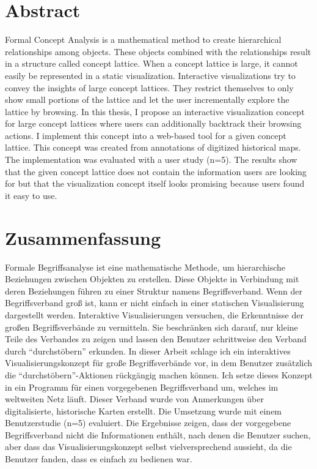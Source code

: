 \documentclass[11pt]{report}
\begin{document}


\renewcommand{\thepage}{\roman{page}}%

\newpage
\thispagestyle{empty}
\mbox{}

\chapter*{Abstract}
Formal Concept Analysis is a mathematical method to create hierarchical relationships among objects. These objects combined with the relationships result in a structure called concept lattice. When a concept lattice is large, it cannot easily be represented in a static visualization. Interactive visualizations try to convey the insights of large concept lattices. They restrict themselves to only show small portions of the lattice and let the user incrementally explore the lattice by browsing. In this thesis, I propose an interactive visualization concept for large concept lattices where users can additionally backtrack their browsing actions. I implement this concept into a web-based tool for a given concept lattice. This concept was created from annotations of digitized historical maps. The implementation was evaluated with a user study (n=5). The results show that the given concept lattice does not contain the information users are looking for but that the visualization concept itself looks promising because users found it easy to use.

\newpage
\thispagestyle{empty}
\mbox{}

\chapter*{Zusammenfassung}

Formale Begriffsanalyse ist eine mathematische Methode, um hierarchische Beziehungen zwischen Objekten zu erstellen. Diese Objekte in Verbindung mit deren Beziehungen führen zu einer Struktur namens Begriffsverband. Wenn der Begriffsverband groß ist, kann er nicht einfach in einer statischen Visualisierung dargestellt werden. Interaktive Visualisierungen versuchen, die Erkenntnisse der großen Begriffsverbände zu vermitteln. Sie beschränken sich darauf, nur kleine Teile des Verbandes zu zeigen und lassen den Benutzer schrittweise den Verband durch ``durchstöbern'' erkunden. In dieser Arbeit schlage ich ein interaktives Visualisierungskonzept für große Begriffsverbände vor, in dem Benutzer zusätzlich die ``durchstöbern''-Aktionen rückgängig machen können. Ich setze dieses Konzept in ein Programm für einen vorgegebenen Begriffsverband um, welches im weltweiten Netz läuft. Dieser Verband wurde von Anmerkungen über digitalisierte, historische Karten erstellt. Die Umsetzung wurde mit einem Benutzerstudie (n=5) evaluiert. Die Ergebnisse zeigen, dass der vorgegebene Begriffsverband nicht die Informationen enthält, nach denen die Benutzer suchen, aber dass das Visualisierungskonzept selbst vielversprechend aussieht, da die Benutzer fanden, dass es einfach zu bedienen war.
\end{document}
